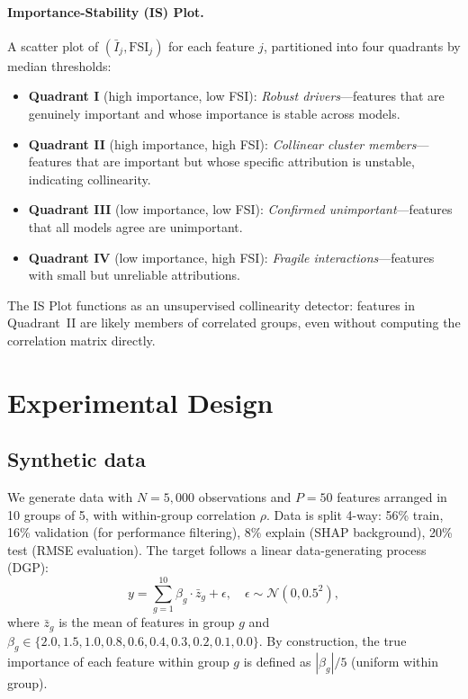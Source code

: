 \documentclass[11pt]{article}
\newcommand{\rhovar}{\rho}
\begin{document}
\paragraph{Importance-Stability (IS) Plot.}
A scatter plot of $(\bar{I}_j, \text{FSI}_j)$ for each feature $j$,
partitioned into four quadrants by median thresholds:
\begin{itemize}
  \item \textbf{Quadrant I} (high importance, low FSI): \emph{Robust
    drivers}---features that are genuinely important and whose importance
    is stable across models.
  \item \textbf{Quadrant II} (high importance, high FSI): \emph{Collinear
    cluster members}---features that are important but whose specific
    attribution is unstable, indicating collinearity.
  \item \textbf{Quadrant III} (low importance, low FSI): \emph{Confirmed
    unimportant}---features that all models agree are unimportant.
  \item \textbf{Quadrant IV} (low importance, high FSI): \emph{Fragile
    interactions}---features with small but unreliable attributions.
\end{itemize}

The IS Plot functions as an unsupervised collinearity detector: features
in Quadrant~II are likely members of correlated groups, even without
computing the correlation matrix directly.


\section{Experimental Design}
\label{sec:experiments}

\subsection{Synthetic data}

We generate data with $N = 5{,}000$ observations and $P = 50$ features
arranged in 10 groups of 5, with within-group correlation $\rhovar$.
Data is split 4-way: 56\% train, 16\% validation (for performance
filtering), 8\% explain (SHAP background), 20\% test (RMSE evaluation).
The target follows a linear data-generating process (DGP):
\begin{equation}
  y = \sum_{g=1}^{10} \beta_g \cdot \bar{z}_g + \epsilon,
  \quad \epsilon \sim \mathcal{N}(0, 0.5^2),
\end{equation}
where $\bar{z}_g$ is the mean of features in group $g$ and
$\beta_g \in \{2.0, 1.5, 1.0, 0.8, 0.6, 0.4, 0.3, 0.2, 0.1, 0.0\}$.
By construction, the true importance of each feature within group $g$ is
defined as $|\beta_g|/5$ (uniform within group).
\end{document}
